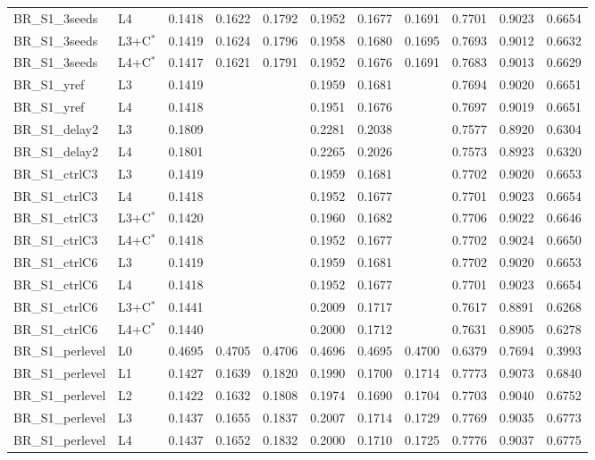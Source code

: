\begin{tabular}{llrrrrrrrrr}
BR\_S1\_3seeds & L4 & 0.1418 & 0.1622 & 0.1792 & 0.1952 & 0.1677 & 0.1691 & 0.7701 & 0.9023 & 0.6654 \\
BR\_S1\_3seeds & L3+C$^{*}$ & 0.1419 & 0.1624 & 0.1796 & 0.1958 & 0.1680 & 0.1695 & 0.7693 & 0.9012 & 0.6632 \\
BR\_S1\_3seeds & L4+C$^{*}$ & 0.1417 & 0.1621 & 0.1791 & 0.1952 & 0.1676 & 0.1691 & 0.7683 & 0.9013 & 0.6629 \\
BR\_S1\_yref & L3 & 0.1419 &  &  & 0.1959 & 0.1681 &  & 0.7694 & 0.9020 & 0.6651 \\
BR\_S1\_yref & L4 & 0.1418 &  &  & 0.1951 & 0.1676 &  & 0.7697 & 0.9019 & 0.6651 \\
BR\_S1\_delay2 & L3 & 0.1809 &  &  & 0.2281 & 0.2038 &  & 0.7577 & 0.8920 & 0.6304 \\
BR\_S1\_delay2 & L4 & 0.1801 &  &  & 0.2265 & 0.2026 &  & 0.7573 & 0.8923 & 0.6320 \\
BR\_S1\_ctrlC3 & L3 & 0.1419 &  &  & 0.1959 & 0.1681 &  & 0.7702 & 0.9020 & 0.6653 \\
BR\_S1\_ctrlC3 & L4 & 0.1418 &  &  & 0.1952 & 0.1677 &  & 0.7701 & 0.9023 & 0.6654 \\
BR\_S1\_ctrlC3 & L3+C$^{*}$ & 0.1420 &  &  & 0.1960 & 0.1682 &  & 0.7706 & 0.9022 & 0.6646 \\
BR\_S1\_ctrlC3 & L4+C$^{*}$ & 0.1418 &  &  & 0.1952 & 0.1677 &  & 0.7702 & 0.9024 & 0.6650 \\
BR\_S1\_ctrlC6 & L3 & 0.1419 &  &  & 0.1959 & 0.1681 &  & 0.7702 & 0.9020 & 0.6653 \\
BR\_S1\_ctrlC6 & L4 & 0.1418 &  &  & 0.1952 & 0.1677 &  & 0.7701 & 0.9023 & 0.6654 \\
BR\_S1\_ctrlC6 & L3+C$^{*}$ & 0.1441 &  &  & 0.2009 & 0.1717 &  & 0.7617 & 0.8891 & 0.6268 \\
BR\_S1\_ctrlC6 & L4+C$^{*}$ & 0.1440 &  &  & 0.2000 & 0.1712 &  & 0.7631 & 0.8905 & 0.6278 \\
BR\_S1\_perlevel & L0 & 0.4695 & 0.4705 & 0.4706 & 0.4696 & 0.4695 & 0.4700 & 0.6379 & 0.7694 & 0.3993 \\
BR\_S1\_perlevel & L1 & 0.1427 & 0.1639 & 0.1820 & 0.1990 & 0.1700 & 0.1714 & 0.7773 & 0.9073 & 0.6840 \\
BR\_S1\_perlevel & L2 & 0.1422 & 0.1632 & 0.1808 & 0.1974 & 0.1690 & 0.1704 & 0.7703 & 0.9040 & 0.6752 \\
BR\_S1\_perlevel & L3 & 0.1437 & 0.1655 & 0.1837 & 0.2007 & 0.1714 & 0.1729 & 0.7769 & 0.9035 & 0.6773 \\
BR\_S1\_perlevel & L4 & 0.1437 & 0.1652 & 0.1832 & 0.2000 & 0.1710 & 0.1725 & 0.7776 & 0.9037 & 0.6775 \\

\end{tabular}
